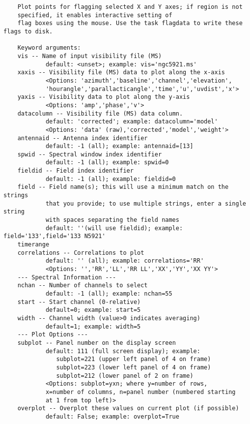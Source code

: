 \vspace{3mm}
\small
\begin{verbatim}
    Plot points for flagging selected X and Y axes; if region is not
    specified, it enables interactive setting of  
    flag boxes using the mouse. Use the task flagdata to write these flags to disk.
    
    Keyword arguments:
    vis -- Name of input visibility file (MS)
            default: <unset>; example: vis='ngc5921.ms'
    xaxis -- Visibility file (MS) data to plot along the x-axis
            <Options: 'azimuth','baseline','channel','elevation',
            'hourangle','parallacticangle','time','u','uvdist','x'>
    yaxis -- Visibility data to plot along the y-axis
            <Options: 'amp','phase','v'>
    datacolumn -- Visibility file (MS) data column.
            default: 'corrected'; example: datacolumn='model'
            <Options: 'data' (raw),'corrected','model','weight'>
    antennaid -- Antenna index identifier
            default: -1 (all); example: antennaid=[13]
    spwid -- Spectral window index identifier
            default: -1 (all); example: spwid=0
    fieldid -- Field index identifier
            default: -1 (all); example: fieldid=0
    field -- Field name(s); this will use a minimum match on the strings
            that you provide; to use multiple strings, enter a single string
            with spaces separating the field names
            default: ''(will use fieldid); example: field='133',field='133 N5921'
    timerange
    correlations -- Correlations to plot
            default: '' (all); example: correlations='RR'
            <Options: '','RR','LL','RR LL','XX','YY','XX YY'>
    --- Spectral Information ---
    nchan -- Number of channels to select
            default: -1 (all); example: nchan=55
    start -- Start channel (0-relative)
            default=0; example: start=5
    width -- Channel width (value>0 indicates averaging)
            default=1; example: width=5
    --- Plot Options ---
    subplot -- Panel number on the display screen
            default: 111 (full screen display); example:
               subplot=221 (upper left panel of 4 on frame)
               subplot=223 (lower left panel of 4 on frame)
               subplot=212 (lower panel of 2 on frame)
            <Options: subplot=yxn; where y=number of rows,
            x=number of columns, n=panel number (numbered starting
            at 1 from top left)>
    overplot -- Overplot these values on current plot (if possible)
            default: False; example: overplot=True

\end{verbatim}
